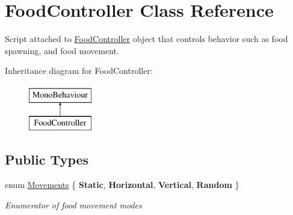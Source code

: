 \hypertarget{class_food_controller}{}\section{Food\+Controller Class Reference}
\label{class_food_controller}


Script attached to \hyperlink{class_food_controller}{Food\+Controller} object that controls behavior such as food spawning, and food movement.  


Inheritance diagram for Food\+Controller\+:\begin{figure}[H]
\begin{center}
\leavevmode
\includegraphics[height=2.000000cm]{class_food_controller}
\end{center}
\end{figure}
\subsection*{Public Types}
\begin{DoxyCompactItemize}
\item 
enum \hyperlink{class_food_controller_ad3c2e51ce55236ad80384113f1593c79}{Movements} \{ {\bfseries Static}, 
{\bfseries Horizontal}, 
{\bfseries Vertical}, 
{\bfseries Random}
 \}\begin{DoxyCompactList}\small\item\em Enumerator of food movement modes \end{DoxyCompactList}
\end{DoxyCompactItemize}
